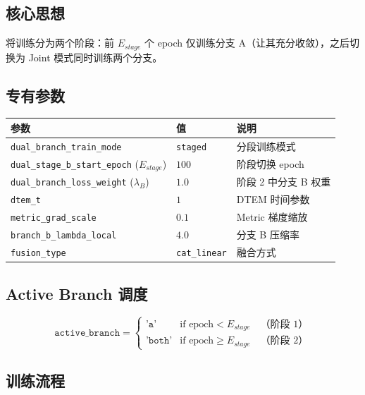 \documentclass[a4paper,11pt]{article}
\begin{document}
\subsection{核心思想}

将训练分为两个阶段：前 $E_{stage}$ 个 epoch 仅训练分支 A（让其充分收敛），之后切换为 Joint 模式同时训练两个分支。

\subsection{专有参数}

\begin{table}[h]
\centering
\begin{tabular}{l l l}
\toprule
\textbf{参数} & \textbf{值} & \textbf{说明} \\
\midrule
\texttt{dual\_branch\_train\_mode} & \texttt{staged} & 分段训练模式 \\
\texttt{dual\_stage\_b\_start\_epoch} ($E_{stage}$) & $100$ & 阶段切换 epoch \\
\texttt{dual\_branch\_loss\_weight} ($\lambda_B$) & $1.0$ & 阶段 2 中分支 B 权重 \\
\texttt{dtem\_t} & $1$ & DTEM 时间参数 \\
\texttt{metric\_grad\_scale} & $0.1$ & Metric 梯度缩放 \\
\texttt{branch\_b\_lambda\_local} & $4.0$ & 分支 B 压缩率 \\
\texttt{fusion\_type} & \texttt{cat\_linear} & 融合方式 \\
\bottomrule
\end{tabular}
\end{table}

\subsection{Active Branch 调度}

\[
    \texttt{active\_branch} = \begin{cases}
        \texttt{'a'} & \text{if } \text{epoch} < E_{stage} \quad \text{（阶段 1）} \\
        \texttt{'both'} & \text{if } \text{epoch} \geq E_{stage} \quad \text{（阶段 2）}
    \end{cases}
\]

\subsection{训练流程}
\end{document}

